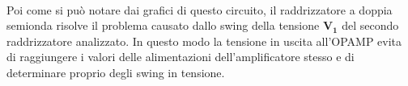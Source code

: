 \documentclass{report}
\begin{document}
\\Poi come si può notare dai grafici di questo circuito, il raddrizzatore a doppia semionda risolve il problema causato dallo swing della tensione $\mathbf{V_1}$ del secondo raddrizzatore analizzato. In questo modo la tensione in uscita all'OPAMP evita di raggiungere i valori delle alimentazioni dell'amplificatore stesso e di determinare proprio degli swing in tensione.

\end{document}
